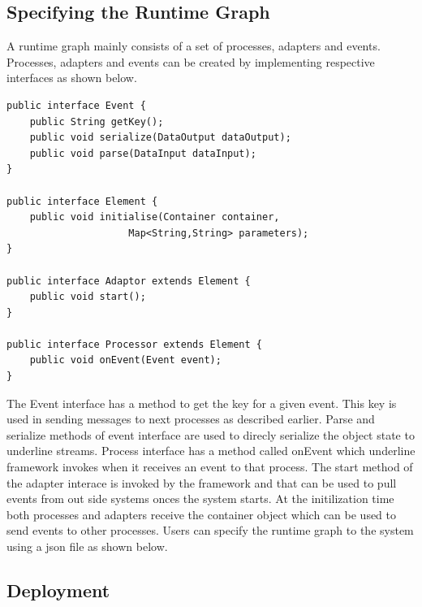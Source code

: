 \subsection{Specifying the Runtime Graph}

A runtime graph mainly consists of a set of processes, adapters and events. Processes, adapters and events can be created by implementing respective interfaces as shown below.



\begin{lstlisting}
public interface Event {
    public String getKey();
    public void serialize(DataOutput dataOutput);
    public void parse(DataInput dataInput);
}

public interface Element {
    public void initialise(Container container,
                     Map<String,String> parameters);
}

public interface Adaptor extends Element {
    public void start();
}

public interface Processor extends Element {
    public void onEvent(Event event);
}
\end{lstlisting}

 The Event interface has a method to get the key for a given event. This key is used in sending messages to next processes as described earlier. Parse and serialize methods of event interface are used to direcly serialize the object state to underline streams. Process interface has a method called onEvent which underline framework invokes when it receives an event to that process. The start method of the adapter interace is invoked by the framework and that can be used to pull events from out side systems onces the system starts. At the initilization time both processes and adapters receive the container object which can be used to send events to other processes. Users can specify the runtime graph to the system using a json file as shown below. 



\subsection{Deployment}

